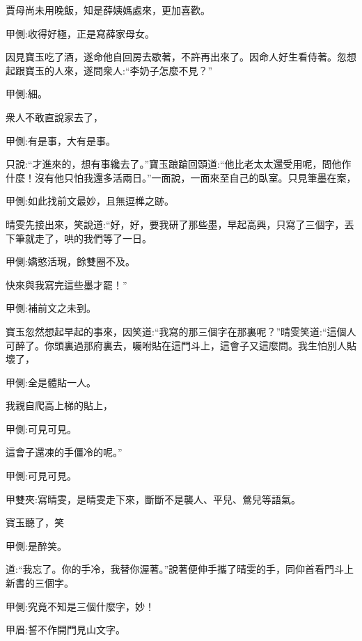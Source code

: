 \begin{parag}
    賈母尚未用晚飯，知是薛姨媽處來，更加喜歡。\begin{note}甲側:收得好極，正是寫薛家母女。\end{note}因見寶玉吃了酒，遂命他自回房去歇著，不許再出來了。因命人好生看侍著。忽想起跟寶玉的人來，遂問衆人:“李奶子怎麼不見？”\begin{note}甲側:細。\end{note}衆人不敢直說家去了，\begin{note}甲側:有是事，大有是事。\end{note}只說:“才進來的，想有事纔去了。”寶玉踉蹌回頭道:“他比老太太還受用呢，問他作什麼！沒有他只怕我還多活兩日。”一面說，一面來至自己的臥室。只見筆墨在案，\begin{note}甲側:如此找前文最妙，且無逗榫之跡。\end{note}晴雯先接出來，笑說道:“好，好，要我研了那些墨，早起高興，只寫了三個字，丟下筆就走了，哄的我們等了一日。\begin{note}甲側:嬌憨活現，餘雙圈不及。\end{note}快來與我寫完這些墨才罷！”\begin{note}甲側:補前文之未到。\end{note}寶玉忽然想起早起的事來，因笑道:“我寫的那三個字在那裏呢？”晴雯笑道:“這個人可醉了。你頭裏過那府裏去，囑咐貼在這門斗上，這會子又這麼問。我生怕別人貼壞了，\begin{note}甲側:全是體貼一人。\end{note}我親自爬高上梯的貼上，\begin{note}甲側:可見可見。\end{note}這會子還凍的手僵冷的呢。”\begin{note}甲側:可見可見。\end{note}\begin{note}甲雙夾:寫晴雯，是晴雯走下來，斷斷不是襲人、平兒、鶯兒等語氣。\end{note}寶玉聽了，笑\begin{note}甲側:是醉笑。\end{note}道:“我忘了。你的手冷，我替你渥著。”說著便伸手攜了晴雯的手，同仰首看門斗上新書的三個字。\begin{note}甲側:究竟不知是三個什麼字，妙！\end{note}\begin{note}甲眉:誓不作開門見山文字。\end{note}
\end{parag}


